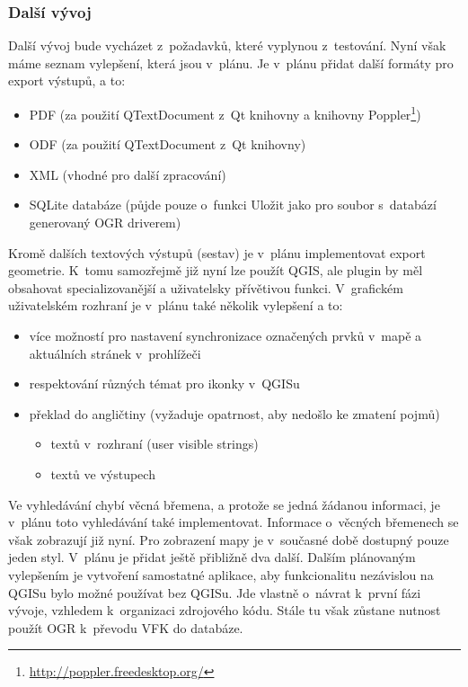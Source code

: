 \documentclass[a4paper,12pt]{article}
\begin{document}
\subsubsection{Další vývoj}
Další vývoj bude vycházet z~požadavků, které vyplynou z~testování. Nyní však máme seznam vylepšení, která jsou v~plánu. Je v~plánu přidat další formáty pro export výstupů, a to:
\begin{itemize}
\item PDF (za použití QTextDocument z~Qt knihovny a knihovny Poppler\footnote{\url{http://poppler.freedesktop.org/}})
\item ODF (za použití QTextDocument z~Qt knihovny)
\item XML (vhodné pro další zpracování)
\item SQLite databáze (půjde pouze o~funkci Uložit jako pro soubor s~databází generovaný OGR driverem)
\end{itemize}
Kromě dalších textových výstupů (sestav) je v~plánu implementovat export geometrie.
K~tomu samozřejmě již nyní lze použít QGIS, ale plugin by měl obsahovat specializovanější a uživatelsky přívětivou funkci.
V~grafickém uživatelském rozhraní je v~plánu také několik vylepšení a to:
\begin{itemize}
\item více možností pro nastavení synchronizace označených prvků v~mapě a aktuálních stránek v~prohlížeči
\item respektování různých témat pro ikonky v~QGISu
\item překlad do angličtiny (vyžaduje opatrnost, aby nedošlo ke zmatení pojmů)
    \begin{itemize}
    \item textů v~rozhraní (user visible strings)
    \item textů ve výstupech
    \end{itemize}
\end{itemize}
Ve vyhledávání chybí věcná břemena, a protože se jedná žádanou informaci, je v~plánu toto vyhledávání také implementovat.
Informace o~věcných břemenech se však zobrazují již nyní.
Pro zobrazení mapy je v~současné době dostupný pouze jeden styl.
V~plánu je přidat ještě přibližně dva další.
Dalším plánovaným vylepšením je vytvoření samostatné aplikace, aby funkcionalitu nezávislou na QGISu bylo možné používat bez QGISu.
Jde vlastně o~návrat k~první fázi vývoje, vzhledem k~organizaci zdrojového kódu.
Stále tu však zůstane nutnost použít OGR k~převodu VFK do databáze.
\end{document}
